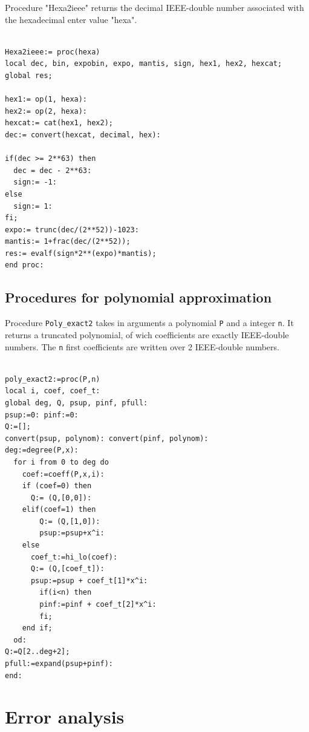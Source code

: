 Procedure "Hexa2ieee" returns the decimal IEEE-double number associated with the hexadecimal enter value "hexa".

\begin{lstlisting}[caption={Hexa2ieee},firstnumber=1]

Hexa2ieee:= proc(hexa)
local dec, bin, expobin, expo, mantis, sign, hex1, hex2, hexcat;
global res;

hex1:= op(1, hexa):
hex2:= op(2, hexa):
hexcat:= cat(hex1, hex2);
dec:= convert(hexcat, decimal, hex):

if(dec >= 2**63) then
  dec = dec - 2**63:
  sign:= -1:
else
  sign:= 1:
fi;  
expo:= trunc(dec/(2**52))-1023:
mantis:= 1+frac(dec/(2**52));
res:= evalf(sign*2**(expo)*mantis);
end proc:
\end{lstlisting}


\subsection{Procedures for polynomial approximation}


Procedure \texttt{Poly\_exact2} takes in arguments a polynomial \texttt{P} and a
integer \texttt{n}. It returns a truncated polynomial, of wich coefficients
are exactly IEEE-double numbers. The \texttt{n} first coefficients are written
over 2 IEEE-double numbers.
 

\begin{lstlisting}[caption={poly\_exact2},firstnumber=1]

poly_exact2:=proc(P,n)
local i, coef, coef_t:
global deg, Q, psup, pinf, pfull:
psup:=0: pinf:=0:
Q:=[];
convert(psup, polynom): convert(pinf, polynom):
deg:=degree(P,x):
  for i from 0 to deg do
    coef:=coeff(P,x,i):
    if (coef=0) then
      Q:= (Q,[0,0]):
    elif(coef=1) then
        Q:= (Q,[1,0]):
        psup:=psup+x^i:
    else        
      coef_t:=hi_lo(coef):
      Q:= (Q,[coef_t]):
      psup:=psup + coef_t[1]*x^i:
        if(i<n) then
        pinf:=pinf + coef_t[2]*x^i:
        fi;
    end if;
  od:
Q:=Q[2..deg+2];
pfull:=expand(psup+pinf):
end:
\end{lstlisting}
\vspace{0.5cm}







\section{Error analysis}

